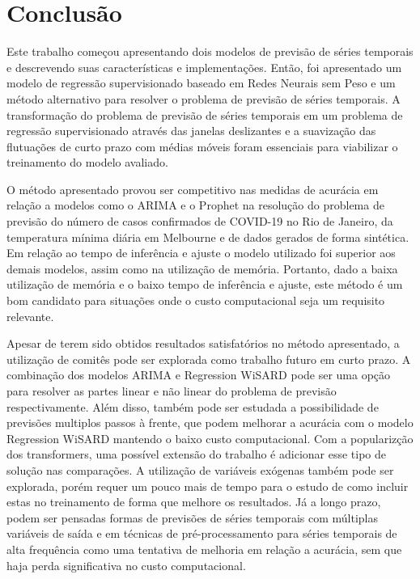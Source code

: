 \chapter{Conclusão}
\label{chap:06}

Este trabalho começou apresentando dois modelos de previsão de séries temporais e descrevendo suas características e implementações. Então, foi apresentado um modelo de regressão supervisionado baseado em Redes Neurais sem Peso e um método alternativo para resolver o problema de previsão de séries temporais. A transformação do problema de previsão de séries temporais em um problema de regressão supervisionado através das janelas deslizantes e a suavização das flutuações de curto prazo com médias móveis foram essenciais para viabilizar o treinamento do modelo avaliado.

O método apresentado provou ser competitivo nas medidas de acurácia em relação a modelos como o ARIMA e o Prophet na resolução do problema de previsão do número de casos confirmados de COVID-19 no Rio de Janeiro, da temperatura mínima diária em Melbourne e de dados gerados de forma sintética. Em relação ao tempo de inferência e ajuste o modelo utilizado foi superior aos demais modelos, assim como na utilização de memória. Portanto, dado a baixa utilização de memória e o baixo tempo de inferência e ajuste, este método é um bom candidato para situações onde o custo computacional seja um requisito relevante.

Apesar de terem sido obtidos resultados satisfatórios no método apresentado, a utilização de comitês pode ser explorada como trabalho futuro em curto prazo. A combinação dos modelos ARIMA e Regression WiSARD pode ser uma opção para resolver as partes linear e não linear do problema de previsão respectivamente. Além disso, também pode ser estudada a possibilidade de previsões multiplos passos à frente, que podem melhorar a acurácia com o modelo Regression WiSARD mantendo o baixo custo computacional. Com a popularizção dos transformers, uma possível extensão do trabalho é adicionar esse tipo de solução nas comparações. A utilização de variáveis exógenas também pode ser explorada, porém requer um pouco mais de tempo para o estudo de como incluir estas no treinamento de forma que melhore os resultados. Já a longo prazo, podem ser pensadas formas de previsões de séries temporais com múltiplas variáveis de saída e em técnicas de pré-processamento para séries temporais de alta frequência como uma tentativa de melhoria em relação a acurácia, sem que haja perda significativa no custo computacional.
